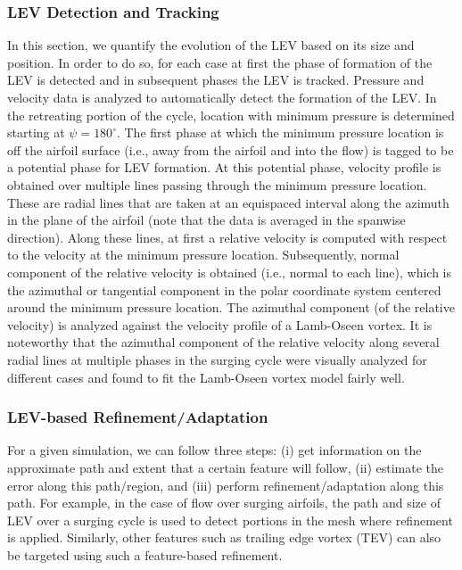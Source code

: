 \subsubsection{LEV Detection and Tracking}


In this section, we quantify the evolution of the LEV based on its size and position.
In order to do so, for each case at first the phase of formation of the LEV is detected and in subsequent phases the LEV is tracked.
Pressure and velocity data is analyzed to automatically detect the formation of the LEV.
In the retreating portion of the cycle, location with minimum pressure is determined starting at $\psi=180^\circ$.
The first phase at which the minimum pressure location is off the airfoil surface (i.e., away from the airfoil and into the flow) is tagged to be a potential phase for LEV formation.
At this potential phase, velocity profile is obtained over multiple lines passing through the minimum pressure location.
These are radial lines that are taken at an equispaced interval along the azimuth in the plane of the airfoil (note that the data is averaged in the spanwise direction).
Along these lines, at first a relative velocity is computed with respect to the velocity at the minimum pressure location.
Subsequently, normal component of the relative velocity is obtained (i.e., normal to each line), which is the azimuthal or tangential component in the polar coordinate system centered around the minimum pressure location.
The azimuthal component (of the relative velocity) is analyzed against the velocity profile of a Lamb-Oseen vortex.
It is noteworthy that the azimuthal component of the relative velocity along several radial lines at multiple phases in the surging cycle were visually analyzed for different cases and found to fit the Lamb-Oseen vortex model fairly well.

\subsubsection{LEV-based Refinement/Adaptation}

For a given simulation, we can follow three steps: (i) get information on the approximate path and extent that a certain feature will follow, (ii) estimate the error along this path/region, and (iii) perform refinement/adaptation along this path.
For example, in the case of flow over surging airfoils, the path and size of LEV over a surging cycle is used to detect portions in the mesh where refinement is applied.
Similarly, other features such as trailing edge vortex (TEV) can also be targeted using such a feature-based refinement.

